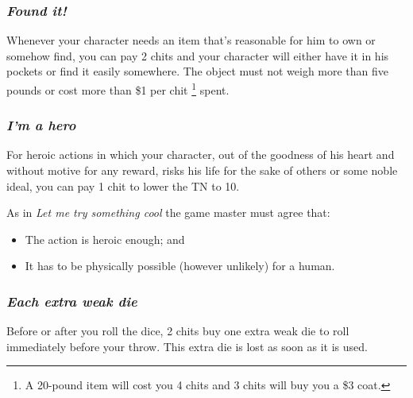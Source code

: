 \subsubsection*{\emph{Found it!}}

Whenever your character needs an item that's reasonable for him to
own or somehow find, you can pay 2 chits and your character will either
have it in his pockets or find it easily somewhere. The object must
not weigh more than five pounds or cost more than \$1 per chit%
\footnote{A 20-pound item will cost you 4 chits and 3 chits will buy you a \$3
coat.%
} spent. 


\subsubsection*{\emph{I'm a hero}}

For heroic actions in which your character, out of the goodness of
his heart and without motive for any reward, risks his life for the
sake of others or some noble ideal, you can pay 1 chit to lower the
TN to 10.\smallskip{}


As in \emph{Let me try something cool} the game master must agree
that: 
\begin{itemize}
\item The action is heroic enough; and
\item It has to be physically possible (however unlikely) for a human.
\end{itemize}

\subsubsection*{\emph{Each extra weak die}}

Before or after you roll the dice, 2 chits buy one extra weak die
to roll immediately before your throw. This extra die is lost as soon
as it is used. 





